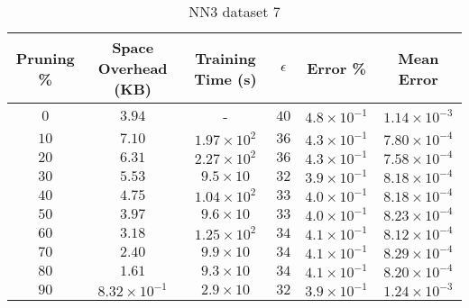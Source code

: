 \begin{adjustwidth}{0cm}{}
\begin{table}
\caption{NN3 dataset 7}\label{pr37}
\begin{tabular}{cccccc}
\hline
\toprule
Pruning \% & Space Overhead (KB) & Training Time (s) & $\epsilon$ & Error \% & Mean Error\\
\midrule
$0$ & $3.94$ & - & $40$ & $4.8 \times 10^{-1}$ & $1.14 \times 10^{-3}$\\
$10$ & $7.10$ & $1.97  \times 10^{2}$ & $36$ & $4.3 \times 10^{-1}$ & $7.80 \times 10^{-4}$\\
$20$ & $6.31$ & $2.27 \times 10^{2}$ & $36$ & $4.3 \times 10^{-1}$ & $7.58 \times 10^{-4}$\\
$30$ & $5.53$ & $9.5 \times 10$ & $32$ & $3.9 \times 10^{-1}$ & $8.18 \times 10^{-4}$\\
$40$ & $4.75$ & $1.04 \times 10^{2}$ & $33$ & $4.0 \times 10^{-1}$ & $8.18 \times 10^{-4}$\\
$50$ & $3.97$ & $9.6 \times 10$ & $33$ & $4.0 \times 10^{-1}$ & $8.23 \times 10^{-4}$\\
$60$ & $3.18$ & $1.25 \times 10^{2}$ & $34$ & $4.1 \times 10^{-1}$ & $8.12 \times 10^{-4}$\\
$70$ & $2.40$ & $9.9 \times 10$ & $34$ & $4.1 \times 10^{-1}$ & $8.29 \times 10^{-4}$\\
$80$ & $1.61$ & $9.3 \times 10$ & $34$ & $4.1 \times 10^{-1}$ & $8.20 \times 10^{-4}$\\
$90$ & $8.32 \times 10^{-1}$ & $2.9 \times 10$ & $32$ & $3.9 \times 10^{-1}$ & $1.24 \times 10^{-3}$\\
\bottomrule
\end{tabular}
\end{table}
\end{adjustwidth}

